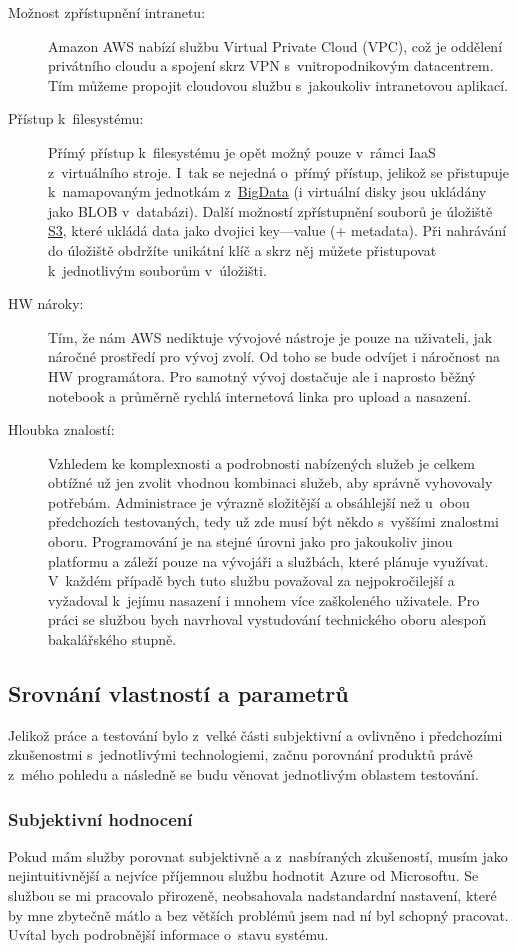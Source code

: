 \begin{description}
	\item [Možnost zpřístupnění intranetu:] Amazon AWS nabízí službu Virtual Private Cloud (VPC), což je oddělení privátního cloudu a spojení skrz VPN s~vnitropodnikovým datacentrem. Tím můžeme propojit cloudovou službu s~jakoukoliv intranetovou aplikací.
	\item [Přístup k~filesystému:] Přímý přístup k~filesystému je opět možný pouze v~rámci IaaS z~virtuálního stroje. I~tak se nejedná o~přímý přístup, jelikož se přistupuje k~namapovaným jednotkám z~\href{http://aws.amazon.com/big-data/}{BigData} (i virtuální disky jsou ukládány jako BLOB v~databázi). Další možností zpřístupnění souborů je úložiště \href{http://aws.amazon.com/s3/}{S3}, které ukládá data jako dvojici key---value (+ metadata). Při nahrávání do úložiště obdržíte unikátní klíč a skrz něj můžete přistupovat k~jednotlivým souborům v~úložišti.
	\item [HW nároky:] Tím, že nám AWS nediktuje vývojové nástroje je pouze na uživateli, jak náročné prostředí pro vývoj zvolí. Od toho se bude odvíjet i náročnost na HW programátora. Pro samotný vývoj dostačuje ale i naprosto běžný notebook a průměrně rychlá internetová linka pro upload a nasazení.
	\item [Hloubka znalostí:] Vzhledem ke komplexnosti a podrobnosti nabízených služeb je celkem obtížné už jen zvolit vhodnou kombinaci služeb, aby správně vyhovovaly potřebám. Administrace je výrazně složitější a obsáhlejší než u~obou předchozích testovaných, tedy už zde musí být někdo s~vyššími znalostmi oboru. Programování je na stejné úrovni jako pro jakoukoliv jinou platformu a záleží pouze na vývojáři a službách, které plánuje využívat. V~každém případě bych tuto službu považoval za nejpokročilejší a vyžadoval k~jejímu nasazení i mnohem více zaškoleného uživatele. Pro práci se službou bych navrhoval vystudování technického oboru alespoň bakalářského stupně.
\end{description}

\subsection{Srovnání vlastností a parametrů}
Jelikož práce a testování bylo z~velké části subjektivní a ovlivněno i předchozími zkušenostmi s~jednotlivými technologiemi, začnu porovnání produktů právě z~mého pohledu a následně se budu věnovat jednotlivým oblastem testování.

\subsubsection{Subjektivní hodnocení}
Pokud mám služby porovnat subjektivně a z~nasbíraných zkušeností, musím jako nejintuitivnější a nejvíce příjemnou službu hodnotit Azure od Microsoftu. Se službou se mi pracovalo přirozeně, neobsahovala nadstandardní nastavení, které by mne zbytečně mátlo a bez větších problémů jsem nad ní byl schopný pracovat. Uvítal bych podrobnější informace o~stavu systému.

